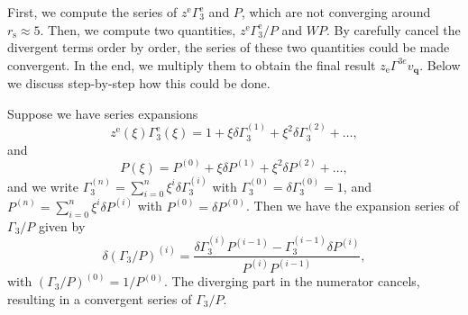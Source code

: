 \documentclass[%
 reprint,
superscriptaddress,
 amsmath,amssymb,
 aps,
prx,
]{revtex4-2}
\newcommand{\bq}{\mathbf{q}}
\newcommand{\txe}{\text{e}}
\newcommand{\txs}{\text{s}}
\newcommand{\verthree}{\Gamma_{3}} %
\begin{document}
\begin{appendices}
First, we compute the series of $z^\txe\Gamma^{\txe}_3$ and $P$, which are not converging around $r_\txs\approx 5$.
Then, we compute two quantities, $z^\txe\Gamma^{\txe}_3/P$ and $WP$. 
By carefully cancel the divergent terms order by order, the series of these two quantities could be made convergent.
In the end, we multiply them to obtain the final result $z_\txe\Gamma^{3e}v_{\bq}$.
Below we discuss step-by-step how this could be done.

Suppose we have series expansions
\begin{equation}
    z^\txe(\xi)\Gamma^{\txe}_3(\xi) = 1 + \xi\delta\verthree^{(1)} + \xi^2\delta\verthree^{(2)}+\ldots,
\end{equation}
and
\begin{equation}
    P(\xi) = P^{(0)} + \xi\delta P^{(1)} + \xi^2\delta P^{(2)} + \ldots,
\end{equation}
and we write $\verthree^{{(n)}}=\sum_{i=0}^{n}\xi^i\delta\verthree^{(i)}$ with $\verthree^{(0)}=\delta\verthree^{(0)}=1$, 
and $P^{(n)}=\sum_{i=0}^{n}\xi^i\delta P^{(i)}$ with $P^{(0)}=\delta P^{(0)}$.
Then we have the expansion series of $\verthree/P$ given by
\begin{equation}
    \delta\left(\verthree/P\right)^{(i)}=\frac{\delta\verthree^{(i)}P^{(i-1)}-\verthree^{(i-1)}\delta P^{(i)}}{{P}^{(i)}{P}^{(i-1)}},
\end{equation}
with $\left(\verthree/{P}\right)^{(0)}=1/{P}^{(0)}$.
The diverging part  in the numerator cancels, resulting in a convergent series of $\verthree/{P}$.


\end{appendices}
\end{document}
